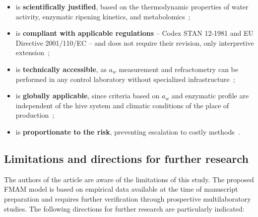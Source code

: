 \begin{itemize}
    \item is \textbf{scientifically justified}, based on the
          thermodynamic properties of water activity, enzymatic
          ripening kinetics, and
          metabolomics~\cite{ruegg1981,zhang2021,guo2020};
    \item is \textbf{compliant with applicable regulations}
          -- Codex STAN 12-1981 and EU Directive 2001/110/EC --
          and does not require their revision, only interpretive
          extension~\cite{codex_stan12,eudir2001110};
    \item is \textbf{technically accessible}, as $a_w$ measurement
          and refractometry can be performed in any control
          laboratory without specialized
          infrastructure~\cite{waaw2006,zamora2006};
    \item is \textbf{globally applicable}, since criteria based
          on $a_w$ and enzymatic profile are independent of the
          hive system and climatic conditions of the place of
          production~\cite{tadele2025,stinglessyeastbrazil2021};
    \item is \textbf{proportionate to the risk}, preventing
          escalation to costly
          methods~\cite{schoder2026,nmrhoney2023}.
\end{itemize}

\subsection{Limitations and directions for further research}

The authors of the article are aware of the limitations of this
study. The proposed FMAM model is based on empirical data available
at the time of manuscript preparation and requires further
verification through prospective multilaboratory studies.
The following directions for further research are particularly
indicated:

